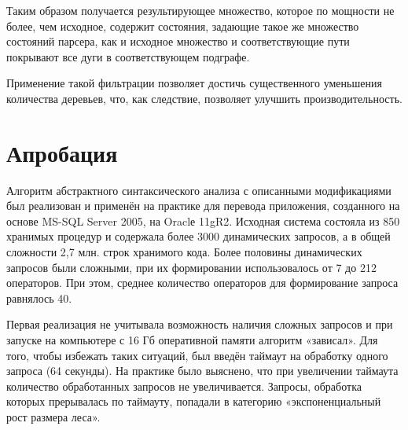 \documentclass[a5paper]{article}
\begin{document}
Таким образом получается результирующее множество, которое по мощности не более, чем исходное, содержит состояния, задающие такое же множество состояний парсера, как и исходное множество и соответствующие пути покрывают все дуги в соответствующем подграфе.

Применение такой фильтрации позволяет достичь существенного уменьшения количества деревьев, что, как следствие, позволяет улучшить производительность. 

\section{ Апробация}

Алгоритм абстрактного синтаксического анализа  с описанными модификациями был реализован и применён на практике для перевода приложения, созданного на основе MS-SQL Server 2005, на Oraclе 11gR2. Исходная система состояла из 850 хранимых процедур и содержала более 3000 динамических запросов, а в общей сложности 2,7 млн. строк хранимого кода. Более половины динамических запросов были сложными, при их формировании использовалось от 7 до 212 операторов. При этом, среднее количество операторов для формирование запроса равнялось 40.

Первая реализация не учитывала возможность наличия сложных запросов и при запуске на компьютере  с 16 Гб оперативной памяти  алгоритм «зависал». Для того, чтобы избежать таких ситуаций, был введён таймаут на обработку одного запроса (64 секунды). На практике было выяснено, что при увеличении таймаута количество обработанных запросов не увеличивается. Запросы, обработка которых прерывалась по таймауту, попадали в категорию «экспоненциальный рост размера леса».
\end{document}
